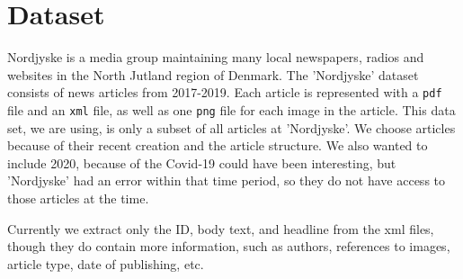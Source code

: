 \section{Dataset}
Nordjyske is a media group maintaining many local newspapers, radios and websites in the North Jutland region of Denmark.
The 'Nordjyske' dataset consists of news articles from 2017-2019. 
Each article is represented with a \texttt{pdf} file and an \texttt{xml} file, as well as one \texttt{png} file for each image in the article.
This data set, we are using, is only a subset of all articles at 'Nordjyske'.
We choose articles because of their recent creation and the article structure.
We also wanted to include 2020, because of the Covid-19 could have been interesting, but 'Nordjyske' had an error within that time period, so they do not have access to those articles at the time.

Currently we extract only the ID, body text, and headline from the xml files, though they do contain more information, such as authors, references to images, article type, date of publishing, etc.